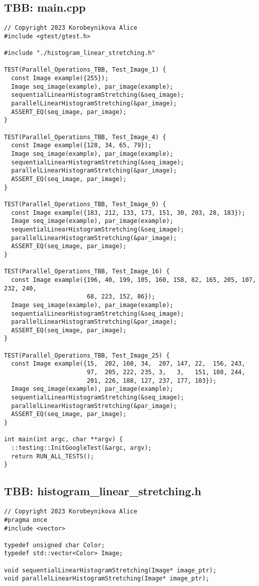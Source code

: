 \documentclass[14pt, russian]{extarticle}
\begin{document}
	\subsection{TBB: main.cpp}
	\begin{lstlisting}
// Copyright 2023 Korobeynikova Alice
#include <gtest/gtest.h>

#include "./histogram_linear_stretching.h"

TEST(Parallel_Operations_TBB, Test_Image_1) {
  const Image example({255});
  Image seq_image(example), par_image(example);
  sequentialLinearHistogramStretching(&seq_image);
  parallelLinearHistogramStretching(&par_image);
  ASSERT_EQ(seq_image, par_image);
}

TEST(Parallel_Operations_TBB, Test_Image_4) {
  const Image example({128, 34, 65, 79});
  Image seq_image(example), par_image(example);
  sequentialLinearHistogramStretching(&seq_image);
  parallelLinearHistogramStretching(&par_image);
  ASSERT_EQ(seq_image, par_image);
}

TEST(Parallel_Operations_TBB, Test_Image_9) {
  const Image example({183, 212, 133, 173, 151, 30, 203, 28, 183});
  Image seq_image(example), par_image(example);
  sequentialLinearHistogramStretching(&seq_image);
  parallelLinearHistogramStretching(&par_image);
  ASSERT_EQ(seq_image, par_image);
}

TEST(Parallel_Operations_TBB, Test_Image_16) {
  const Image example({196, 40, 199, 105, 160, 158, 82, 165, 205, 107, 232, 240,
                       68, 223, 152, 86});
  Image seq_image(example), par_image(example);
  sequentialLinearHistogramStretching(&seq_image);
  parallelLinearHistogramStretching(&par_image);
  ASSERT_EQ(seq_image, par_image);
}

TEST(Parallel_Operations_TBB, Test_Image_25) {
  const Image example({15,  202, 160, 34,  207, 147, 22,  156, 243,
                       97,  205, 222, 235, 3,   3,   151, 108, 244,
                       201, 226, 188, 127, 237, 177, 103});
  Image seq_image(example), par_image(example);
  sequentialLinearHistogramStretching(&seq_image);
  parallelLinearHistogramStretching(&par_image);
  ASSERT_EQ(seq_image, par_image);
}

int main(int argc, char **argv) {
  ::testing::InitGoogleTest(&argc, argv);
  return RUN_ALL_TESTS();
}
	\end{lstlisting}
	\newpage
	
	\subsection{TBB: histogram\_linear\_stretching.h}
	\begin{lstlisting}
// Copyright 2023 Korobeynikova Alice
#pragma once
#include <vector>

typedef unsigned char Color;
typedef std::vector<Color> Image;

void sequentialLinearHistogramStretching(Image* image_ptr);
void parallelLinearHistogramStretching(Image* image_ptr);

	\end{lstlisting}
	\newpage
	
\end{document}
